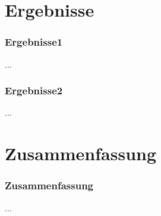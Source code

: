 \documentclass[student, noshadow, lsr, english, aspectratio=169]{ITR_LSR_slides}
\begin{document}
\section{Ergebnisse}

\begin{frame}
	\frametitle{Ergebnisse1}
	...
\end{frame}

\begin{frame}
	\frametitle{Ergebnisse2}
	...
\end{frame}



\section{Zusammenfassung}

\begin{frame}
	\frametitle{Zusammenfassung}
	...
\end{frame}

\appendix
\end{document}
